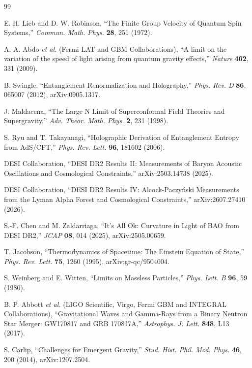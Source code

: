 \documentclass[aps,prd,onecolumn,nofootinbib,superscriptaddress]{revtex4-2}
\begin{document}
\begin{thebibliography}{99}

E. H. Lieb and D. W. Robinson, ``The Finite Group Velocity of Quantum Spin Systems,'' \emph{Commun. Math. Phys.} \textbf{28}, 251 (1972).

A. A. Abdo \emph{et al.} (Fermi LAT and GBM Collaborations), ``A limit on the variation of the speed of light arising from quantum gravity effects,'' \emph{Nature} \textbf{462}, 331 (2009).

B. Swingle, ``Entanglement Renormalization and Holography,'' \emph{Phys. Rev. D} \textbf{86}, 065007 (2012), arXiv:0905.1317.

J. Maldacena, ``The Large N Limit of Superconformal Field Theories and Supergravity,'' \emph{Adv. Theor. Math. Phys.} \textbf{2}, 231 (1998).

S. Ryu and T. Takayanagi, ``Holographic Derivation of Entanglement Entropy from AdS/CFT,'' \emph{Phys. Rev. Lett.} \textbf{96}, 181602 (2006).

DESI Collaboration, ``DESI DR2 Results II: Measurements of Baryon Acoustic Oscillations and Cosmological Constraints,'' arXiv:2503.14738 (2025).

DESI Collaboration, ``DESI DR2 Results IV: Alcock-Paczy\'nski Measurements from the Lyman Alpha Forest and Cosmological Constraints,'' arXiv:2607.27410 (2026).

S.-F. Chen and M. Zaldarriaga, ``It's All Ok: Curvature in Light of BAO from DESI DR2,'' \emph{JCAP} \textbf{08}, 014 (2025), arXiv:2505.00659.

T. Jacobson, ``Thermodynamics of Spacetime: The Einstein Equation of State,'' \emph{Phys. Rev. Lett.} \textbf{75}, 1260 (1995), arXiv:gr-qc/9504004.

S. Weinberg and E. Witten, ``Limits on Massless Particles,'' \emph{Phys. Lett. B} \textbf{96}, 59 (1980).

B. P. Abbott \emph{et al.} (LIGO Scientific, Virgo, Fermi GBM and INTEGRAL Collaborations), ``Gravitational Waves and Gamma-Rays from a Binary Neutron Star Merger: GW170817 and GRB 170817A,'' \emph{Astrophys. J. Lett.} \textbf{848}, L13 (2017).

S. Carlip, ``Challenges for Emergent Gravity,'' \emph{Stud. Hist. Phil. Mod. Phys.} \textbf{46}, 200 (2014), arXiv:1207.2504.


\end{thebibliography}
\end{document}
